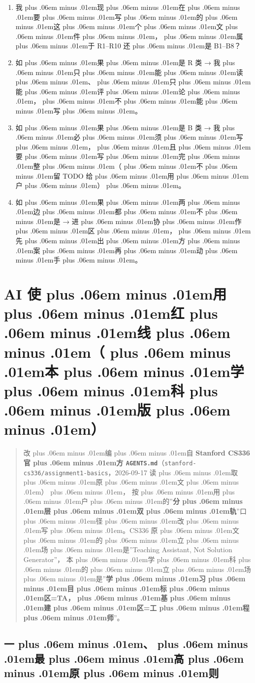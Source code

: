 \documentclass[
]{article}
\newcommand{\passthrough}[1]{#1}
\providecommand{\tightlist}{%
  \setlength{\itemsep}{0pt}\setlength{\parskip}{0pt}}
\def\zh#1{{\zhfont #1}}
\def\sym#1{{\symfont #1}}
\def\zhglue{\hskip0pt plus .06em minus .01em}
\begin{document}
\begin{enumerate}
\def\labelenumi{\arabic{enumi}.}
\tightlist
\item
  \zh{我\zhglue 现\zhglue 在\zhglue 要\zhglue 写\zhglue 的\zhglue 这\zhglue 个\zhglue 文\zhglue 件\zhglue ，\zhglue 属\zhglue 于} R1--R10 \zh{还\zhglue 是} B1--B8\zh{？}
\item
  \zh{如\zhglue 果\zhglue 是} R \zh{类} \sym{→} \zh{我\zhglue 只\zhglue 能\zhglue 读\zhglue 、\zhglue 只\zhglue 能\zhglue 评\zhglue 论\zhglue ，\zhglue 不\zhglue 能\zhglue 写\zhglue 。}
\item
  \zh{如\zhglue 果\zhglue 是} B \zh{类} \sym{→} \zh{我\zhglue 必\zhglue 须\zhglue 写\zhglue ，\zhglue 且\zhglue 要\zhglue 写\zhglue 完\zhglue 整\zhglue （\zhglue 不\zhglue 留} TODO \zh{给\zhglue 用\zhglue 户\zhglue ）\zhglue 。}
\item
  \zh{如\zhglue 果\zhglue 两\zhglue 边\zhglue 都\zhglue 不\zhglue 是} \sym{→} \zh{进\zhglue 协\zhglue 作\zhglue 区\zhglue ，\zhglue 先\zhglue 出\zhglue 方\zhglue 案\zhglue 再\zhglue 动\zhglue 手\zhglue 。}
\end{enumerate}

\newpage

\section{AI \zh{使\zhglue 用\zhglue 红\zhglue 线\zhglue （\zhglue 本\zhglue 学\zhglue 科\zhglue 版\zhglue ）}}\label{ai-ux4f7fux7528ux7ea2ux7ebfux672cux5b66ux79d1ux7248}

\begin{quote}
\zh{改\zhglue 编\zhglue 自} \textbf{Stanford CS336 \zh{官\zhglue 方} \passthrough{\lstinline!AGENTS.md!}}\zh{（}\passthrough{\lstinline!stanford-cs336/assignment1-basics!}\zh{，}2026-09-17 \zh{读\zhglue 取\zhglue 原\zhglue 文\zhglue ）\zhglue ，} \zh{按\zhglue 用\zhglue 户\zhglue 的}''\textbf{\zh{分\zhglue 层\zhglue 双\zhglue 轨}}''\zh{口\zhglue 径\zhglue 改\zhglue 写\zhglue 。}CS336 \zh{原\zhglue 文\zhglue 的\zhglue 立\zhglue 场\zhglue 是}''Teaching Assistant, Not Solution Generator''\zh{，} \zh{本\zhglue 学\zhglue 科\zhglue 的\zhglue 立\zhglue 场\zhglue 是}''\textbf{\zh{学\zhglue 习\zhglue 目\zhglue 标\zhglue 区}=TA\zh{，\zhglue 基\zhglue 建\zhglue 区}=\zh{工\zhglue 程\zhglue 师}}''\zh{。}
\end{quote}

\subsection{\zh{一\zhglue 、\zhglue 最\zhglue 高\zhglue 原\zhglue 则}}\label{ux4e00ux6700ux9ad8ux539fux5219}
\end{document}

